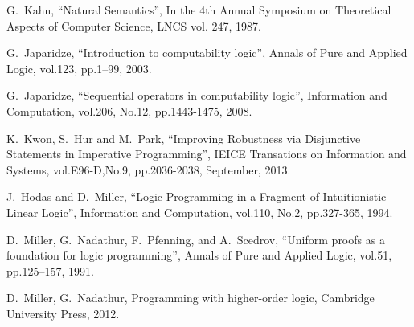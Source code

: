 \documentclass[letter]{ieice}
\begin{document}

\begin{thebibliography}{1}

G.~Kahn,  ``Natural Semantics'', In the 4th Annual Symposium on Theoretical Aspects of Computer Science, 
LNCS vol. 247,  1987.



G.~Japaridze, ``Introduction to computability logic'', Annals  of Pure and
 Applied  Logic, vol.123, pp.1--99, 2003.

G.~Japaridze,   ``Sequential operators in computability logic'',
 Information and Computation, vol.206, No.12, pp.1443-1475, 2008.  

K.~Kwon, S.~Hur and M.~Park,  ``Improving Robustness via Disjunctive Statements in Imperative  Programming'', IEICE Transations on Information and Systems, vol.E96-D,No.9, pp.2036-2038, September, 2013.  

J.~Hodas and D.~Miller,   ``Logic Programming in a Fragment of Intuitionistic Linear Logic'', 
 Information and Computation, vol.110, No.2, pp.327-365, 1994. 



D.~Miller, G.~Nadathur, F.~Pfenning, and A.~Scedrov, ``Uniform proofs as a
  foundation for logic programming'', Annals of Pure and Applied Logic, vol.51,
  pp.125--157, 1991.

D.~Miller, G.~Nadathur, Programming with higher-order logic, Cambridge University Press,   2012.
\end{thebibliography}

 
\end{document}
